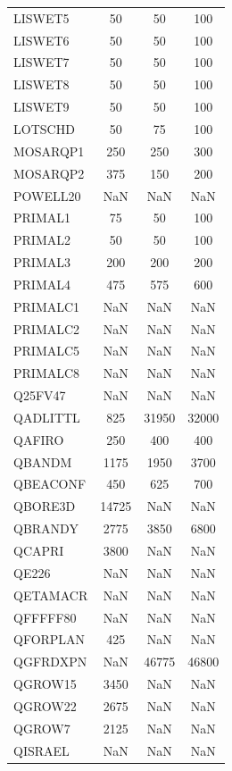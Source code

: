 \begin{longtable}{lccc}
LISWET5  &    50 &    50 &    100 \\
LISWET6  &    50 &    50 &    100 \\
LISWET7  &    50 &    50 &    100 \\
LISWET8  &    50 &    50 &    100 \\
LISWET9  &    50 &    50 &    100 \\
LOTSCHD  &    50 &    75 &    100 \\
MOSARQP1 &   250 &   250 &    300 \\
MOSARQP2 &   375 &   150 &    200 \\
POWELL20 &   NaN &   NaN &    NaN \\
PRIMAL1  &    75 &    50 &    100 \\
PRIMAL2  &    50 &    50 &    100 \\
PRIMAL3  &   200 &   200 &    200 \\
PRIMAL4  &   475 &   575 &    600 \\
PRIMALC1 &   NaN &   NaN &    NaN \\
PRIMALC2 &   NaN &   NaN &    NaN \\
PRIMALC5 &   NaN &   NaN &    NaN \\
PRIMALC8 &   NaN &   NaN &    NaN \\
Q25FV47  &   NaN &   NaN &    NaN \\
QADLITTL &   825 & 31950 &  32000 \\
QAFIRO   &   250 &   400 &    400 \\
QBANDM   &  1175 &  1950 &   3700 \\
QBEACONF &   450 &   625 &    700 \\
QBORE3D  & 14725 &   NaN &    NaN \\
QBRANDY  &  2775 &  3850 &   6800 \\
QCAPRI   &  3800 &   NaN &    NaN \\
QE226    &   NaN &   NaN &    NaN \\
QETAMACR &   NaN &   NaN &    NaN \\
QFFFFF80 &   NaN &   NaN &    NaN \\
QFORPLAN &   425 &   NaN &    NaN \\
QGFRDXPN &   NaN & 46775 &  46800 \\
QGROW15  &  3450 &   NaN &    NaN \\
QGROW22  &  2675 &   NaN &    NaN \\
QGROW7   &  2125 &   NaN &    NaN \\
QISRAEL  &   NaN &   NaN &    NaN \\

\end{longtable}
